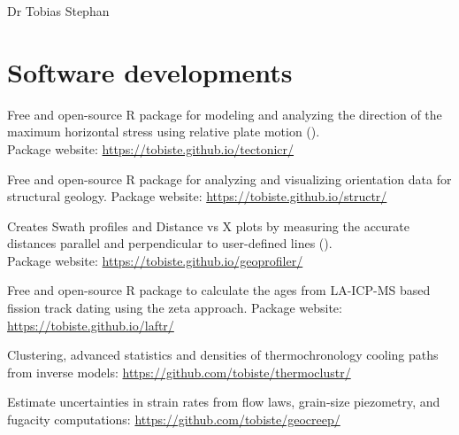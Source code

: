 \documentclass[10pt, paper=letter]{scrartcl} %
\begin{document}
\begin{cv}{\textcolor{myred}{\textsf{Dr Tobias Stephan}}}
    \section{Software developments}
    \begin{cvlist}{}
        \item[\texttt{tectonicr}] Free and open-source R package for modeling and analyzing the direction of the maximum horizontal stress using relative plate motion ().\\
        Package website: \url{https://tobiste.github.io/tectonicr/}
        \item[\texttt{structr}] Free and open-source R package for analyzing and visualizing orientation data for structural geology.
        Package website: \url{https://tobiste.github.io/structr/}
        \item[\texttt{geoprofiler}] Creates Swath profiles and Distance vs X plots by measuring the accurate distances parallel and perpendicular to user-defined lines ().\\
        Package website: \url{https://tobiste.github.io/geoprofiler/}
        \item[\texttt{laftr}] Free and open-source R package to calculate the ages from LA-ICP-MS based fission track dating using the zeta approach. Package website: \url{https://tobiste.github.io/laftr/}
        \item[\texttt{thermoclustr}] Clustering, advanced statistics and densities of thermochronology cooling paths from inverse models: \url{https://github.com/tobiste/thermoclustr/}
        \item[\texttt{geocreep}] Estimate uncertainties in strain rates from flow laws, grain-size piezometry, and fugacity computations: \url{https://github.com/tobiste/geocreep/}
    \end{cvlist}


\end{cv}
\end{document}
